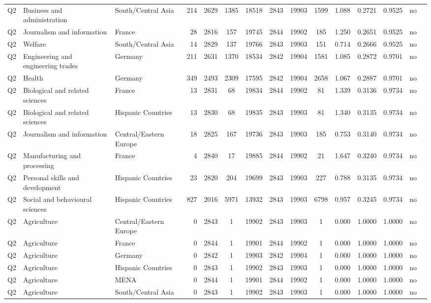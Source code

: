 \begin{longtable}{lllrcccccccccll}
Q2 & Business and administration & South/Central Asia & 214 & 2629 & 1385 & 18518 & 2843 & 19903 & 1599 & 1.088 & 0.2721 & 0.9525 & no \\
Q2 & Journalism and information & France & 28 & 2816 & 157 & 19745 & 2844 & 19902 & 185 & 1.250 & 0.2651 & 0.9525 & no \\
Q2 & Welfare & South/Central Asia & 14 & 2829 & 137 & 19766 & 2843 & 19903 & 151 & 0.714 & 0.2666 & 0.9525 & no \\
Q2 & Engineering and engineering trades & Germany & 211 & 2631 & 1370 & 18534 & 2842 & 19904 & 1581 & 1.085 & 0.2872 & 0.9701 & no \\
Q2 & Health & Germany & 349 & 2493 & 2309 & 17595 & 2842 & 19904 & 2658 & 1.067 & 0.2887 & 0.9701 & no \\
Q2 & Biological and related sciences & France & 13 & 2831 & 68 & 19834 & 2844 & 19902 & 81 & 1.339 & 0.3136 & 0.9734 & no \\
Q2 & Biological and related sciences & Hispanic Countries & 13 & 2830 & 68 & 19835 & 2843 & 19903 & 81 & 1.340 & 0.3135 & 0.9734 & no \\
Q2 & Journalism and information & Central/Eastern Europe & 18 & 2825 & 167 & 19736 & 2843 & 19903 & 185 & 0.753 & 0.3140 & 0.9734 & no \\
Q2 & Manufacturing and processing & France & 4 & 2840 & 17 & 19885 & 2844 & 19902 & 21 & 1.647 & 0.3240 & 0.9734 & no \\
Q2 & Personal skills and development & Hispanic Countries & 23 & 2820 & 204 & 19699 & 2843 & 19903 & 227 & 0.788 & 0.3135 & 0.9734 & no \\
Q2 & Social and behavioural sciences & Hispanic Countries & 827 & 2016 & 5971 & 13932 & 2843 & 19903 & 6798 & 0.957 & 0.3245 & 0.9734 & no \\
Q2 & Agriculture & Central/Eastern Europe & 0 & 2843 & 1 & 19902 & 2843 & 19903 & 1 & 0.000 & 1.0000 & 1.0000 & no \\
Q2 & Agriculture & France & 0 & 2844 & 1 & 19901 & 2844 & 19902 & 1 & 0.000 & 1.0000 & 1.0000 & no \\
Q2 & Agriculture & Germany & 0 & 2842 & 1 & 19903 & 2842 & 19904 & 1 & 0.000 & 1.0000 & 1.0000 & no \\
Q2 & Agriculture & Hispanic Countries & 0 & 2843 & 1 & 19902 & 2843 & 19903 & 1 & 0.000 & 1.0000 & 1.0000 & no \\
Q2 & Agriculture & MENA & 0 & 2844 & 1 & 19901 & 2844 & 19902 & 1 & 0.000 & 1.0000 & 1.0000 & no \\
Q2 & Agriculture & South/Central Asia & 0 & 2843 & 1 & 19902 & 2843 & 19903 & 1 & 0.000 & 1.0000 & 1.0000 & no \\

\end{longtable}
